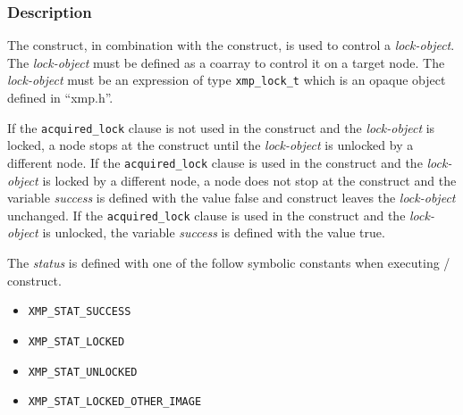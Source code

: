 \subsubsection*{Description}
The {\tt {}} construct, in combination with the {\tt {}} construct,
is used to control a {\it lock-object}.
The {\it lock-object} must be defined as a coarray to control it on a target node.
The {\it lock-object} must be an expression of type {\tt xmp\_lock\_t} 
which is an opaque object defined in ``xmp.h''.

If the {\tt acquired\_lock} clause is not used in the {\tt {}} construct and 
the {\it lock-object} is locked,
a node stops at the {\tt {}} construct until the {\it lock-object} is unlocked by a different node.
If the {\tt acquired\_lock} clause is used in the {\tt {}} construct and 
the {\it lock-object} is locked by a different node,
a node does not stop at the {\tt {}} construct and the variable {\it success} is defined with the value false
and {\tt {}} construct leaves the {\it lock-object} unchanged.
If the {\tt acquired\_lock} clause is used in the {\tt {}} construct and the {\it lock-object} is unlocked,
the variable {\it success} is defined with the value true.

The {\it status} is defined with one of the follow symbolic constants 
when executing {\tt {}}/{\tt {}} construct.

\begin{itemize}
\item {\tt XMP\_STAT\_SUCCESS} \vspace{-2mm}
\item {\tt XMP\_STAT\_LOCKED} \vspace{-2mm}
\item {\tt XMP\_STAT\_UNLOCKED} \vspace{-2mm}
\item {\tt XMP\_STAT\_LOCKED\_OTHER\_IMAGE}
\end{itemize}

